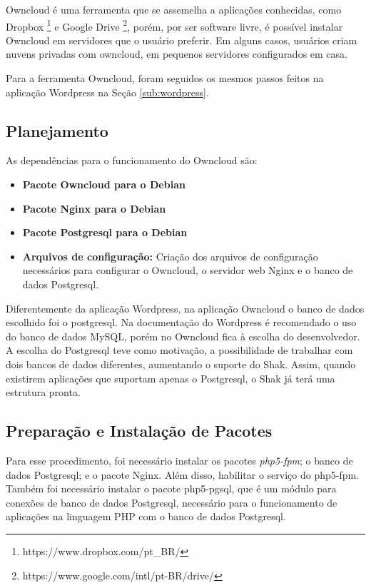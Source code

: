 Owncloud é uma ferramenta que se assemelha a aplicações conhecidas, como Dropbox
\footnote{https://www.dropbox.com/pt\_BR/} e Google Drive \footnote{https://www.google.com/intl/pt-BR/drive/}, porém, por ser software livre, é possível instalar Owncloud em servidores
que o usuário preferir. Em alguns casos, usuários criam nuvens privadas com 
owncloud, em pequenos servidores configurados em casa.

Para a ferramenta Owncloud, foram seguidos os mesmos passos feitos na aplicação
Wordpress na Seção \ref{sub:wordpress}.

\subsection{Planejamento}

As dependências para o funcionamento do Owncloud são:

\begin{itemize}
   \item \textbf{Pacote Owncloud para o Debian}
   \item \textbf{Pacote Nginx para o Debian}
   \item \textbf{Pacote Postgresql para o Debian}
   \item \textbf{Arquivos de configuração:} Criação dos arquivos de configuração
   necessários para configurar o Owncloud, o servidor web Nginx e o banco de dados
   Postgresql.
\end{itemize}

Diferentemente da aplicação Wordpress, na aplicação Owncloud o 
banco de dados escolhido foi o postgresql. Na documentação do Wordpress é recomendado
o uso do banco de dados MySQL, porém no Owncloud fica à escolha do desenvolvedor.
A escolha do Postgresql teve como motivação, a possibilidade de trabalhar com dois bancos de
dados diferentes, aumentando o suporte do Shak. Assim, quando existirem aplicações
que suportam apenas o Postgresql, o Shak já terá uma estrutura pronta.

\subsection{Preparação e Instalação de Pacotes}

Para esse procedimento, foi necessário instalar os pacotes \textit{php5-fpm}; o banco
de dados Postgresql; e o pacote Nginx. Além disso, habilitar o serviço do php5-fpm. 
Também foi necessário instalar o pacote php5-pgsql, que é um módulo para
conexões de banco de dados Postgresql, necessário para o funcionamento de
aplicações na linguagem PHP com o banco de dados Postgresql.

